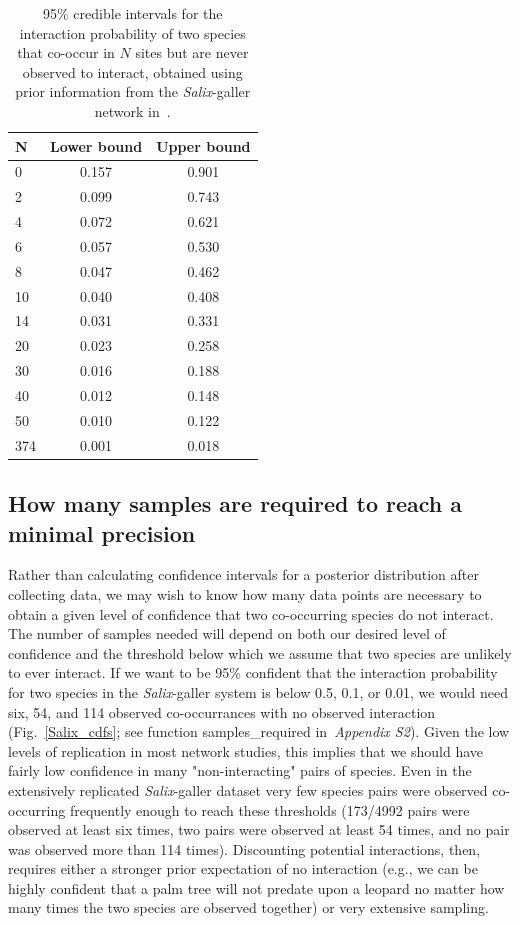 ﻿\documentclass[12pt]{article}
\begin{document}
      \begin{table}[h]
        \caption{95\% credible intervals for the interaction probability of two species that co-occur in $N$ sites but are never observed to interact, obtained using prior information from the \emph{Salix}-galler network in~\citet{Barbour2016,Barbour2016Dryad}.}
        \label{interval_table}
        \begin{tabular}{l | c c}
        N & Lower bound & Upper bound \\
        \hline
        0   & 0.157 & 0.901 \\
        2   & 0.099 & 0.743 \\
        4   & 0.072 & 0.621 \\
        6   & 0.057 & 0.530 \\
        8   & 0.047 & 0.462 \\
        10 & 0.040 & 0.408 \\
        14 & 0.031 & 0.331 \\
        20 & 0.023 & 0.258 \\
        30 & 0.016 & 0.188 \\
        40 & 0.012 & 0.148 \\
        50 & 0.010 & 0.122 \\
        \hline
        374 & 0.001 & 0.018 \\
        \hline
        \end{tabular}
        \end{table}


  \subsection*{How many samples are required to reach a minimal precision}

      Rather than calculating confidence intervals for a posterior distribution after collecting data, we may wish to know how many data points are necessary to obtain a given level of confidence that two co-occurring species do not interact. The number of samples needed will depend on both our desired level of confidence and the threshold below which we assume that two species are unlikely to ever interact. If we want to be 95\% confident that the interaction probability for two species in the \emph{Salix}-galler system is below 0.5, 0.1, or 0.01, we would need six, 54, and 114 observed co-occurrances with no observed interaction (Fig.~\ref{Salix_cdfs}; see function samples\_required in~\emph{Appendix S2}). Given the low levels of replication in most network studies, this implies that we should have fairly low confidence in many "non-interacting" pairs of species. Even in the extensively replicated \emph{Salix}-galler dataset very few species pairs were observed co-occurring frequently enough to reach these thresholds (173/4992 pairs were observed at least six times, two pairs were observed at least 54 times, and no pair was observed more than 114 times). Discounting potential interactions, then, requires either a stronger prior expectation of no interaction (e.g., we can be highly confident that a palm tree will not predate upon a leopard no matter how many times the two species are observed together) or very extensive sampling.
\end{document}
